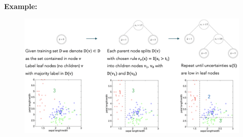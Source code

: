 \documentclass[a4paper]{extarticle}
\begin{document}
\begin{ebox}
    \textbf{Example:}

    \begin{figure}[H]
        \includegraphics[width=15cm]{../images/IntroML_Fig5-3}
        \centering
    \end{figure}    
\end{ebox}
\end{document}
